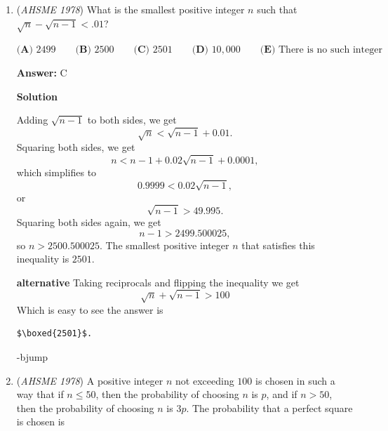 \begin{enumerate}
 $\textbf{(A) }\sqrt{k}\qquad \textbf{(B) }2k\qquad \textbf{(C) }k\sqrt{k}\qquad \textbf{(D) }k^2\qquad  \textbf{(E) }y\sqrt{k}$

 \textbf{Answer: }D



\textbf{Solution}

We are given that 
 \[[f(x^2 + 1)]^{\sqrt(x)} = k\]We can rewrite $\frac{9+y^2}{y^2}$ as $\frac{9}{y^2} + 1$Thus, our function is now
 \[[f(\frac{9}{y^2} + 1)]^{\sqrt{\frac{12}{y}}} = k\]
 \[\Rrightarrow[f(\frac{9}{y^2} + 1)]^{\sqrt{\frac{3}{y} \cdot 4}} = k\]
 \[\Rrightarrow([f(\frac{9}{y^2} + 1)]^{\sqrt{\frac{3}{y}}})^{\sqrt{4}} = (k)^{\sqrt{4}}\]
 \[\Rrightarrow([f(\frac{9}{y^2} + 1)]^{\sqrt{\frac{3}{y}}})^{2} = (k)^{2} = k^2\]

 Thus, the answer is $k^2\implies \boxed{D}$.

 


	\item (\textit{AHSME 1978}) What is the smallest positive integer $n$ such that $\sqrt{n}-\sqrt{n-1}<.01$?


 $\textbf{(A) }2499\qquad \textbf{(B) }2500\qquad \textbf{(C) }2501\qquad \textbf{(D) }10,000\qquad  \textbf{(E) }\text{There is no such integer}$

 \textbf{Answer: }C



\textbf{Solution}

Adding $\sqrt{n - 1}$ to both sides, we get
 \[\sqrt{n} < \sqrt{n - 1} + 0.01.\]Squaring both sides, we get
 \[n < n - 1 + 0.02 \sqrt{n - 1} + 0.0001,\]which simplifies to
 \[0.9999 < 0.02 \sqrt{n - 1},\]or
 \[\sqrt{n - 1} > 49.995.\]Squaring both sides again, we get
 \[n - 1 > 2499.500025,\]so $n > 2500.500025$. The smallest positive integer $n$ that satisfies this inequality is $\boxed{2501}$.

 \textbf{alternative} Taking reciprocals and flipping the inequality we get 
 \[\sqrt{n}+\sqrt{n-1}>100\] Which is easy to see the answer is

 \begin{verbatim}
$\boxed{2501}$.
\end{verbatim}

-bjump

 


	\item (\textit{AHSME 1978}) A positive integer $n$ not exceeding $100$ is chosen in such a way that if $n\le 50$, then the probability of choosing 
$n$ is $p$, and if $n > 50$, then the probability of choosing $n$ is $3p$. The probability that a perfect square is chosen is



\end{enumerate}
